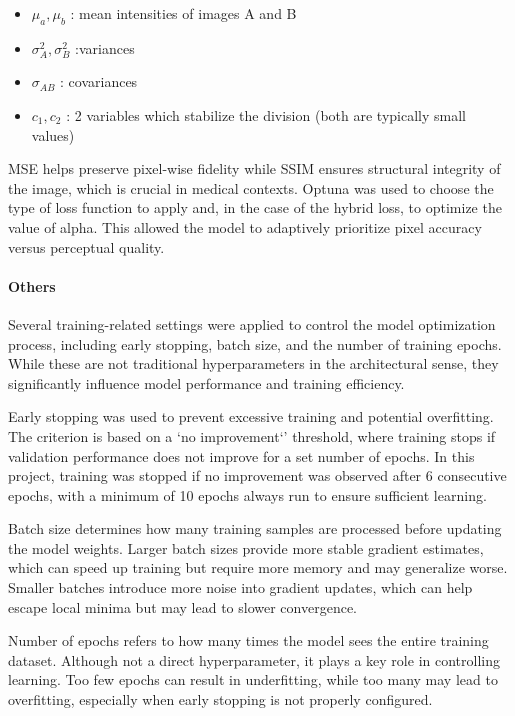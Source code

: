 \documentclass[twocolumn]{article}
\begin{document}
\begin{itemize}
    \item $\mu_a,\mu_b$ : mean intensities of images A and B
    \item $\sigma_A^2, \sigma_B^2$ :variances
    \item $\sigma_{AB}$ : covariances
    \item $c_1,c_2$ : 2 variables which stabilize the division (both are typically small values)
\end{itemize}

MSE helps preserve pixel-wise fidelity while SSIM ensures structural integrity of the image, which is crucial in medical contexts. 
Optuna was used to choose the type of loss function to apply and, in the case of the hybrid loss, to optimize the value of alpha. 
This allowed the model to adaptively prioritize pixel accuracy versus perceptual quality. 

\paragraph{Others}
Several training-related settings were applied to control the model optimization process, including early stopping, batch size, and the number of training epochs.
 While these are not traditional hyperparameters in the architectural sense, they significantly influence model performance and training efficiency.

Early stopping was used to prevent excessive training and potential overfitting. The criterion is based on a `no improvement`' threshold, where training stops if validation performance does not improve for a set number of epochs. 
In this project, training was stopped if no improvement was observed after 6 consecutive epochs, with a minimum of 10 epochs always run to ensure sufficient learning.

Batch size determines how many training samples are processed before updating the model weights. Larger batch sizes provide more stable gradient estimates, which can speed up training but require more memory and may generalize worse. 
Smaller batches introduce more noise into gradient updates, which can help escape local minima but may lead to slower convergence.

Number of epochs refers to how many times the model sees the entire training dataset. Although not a direct hyperparameter, it plays a key role in controlling learning. 
Too few epochs can result in underfitting, while too many may lead to overfitting, especially when early stopping is not properly configured.
\end{document}
